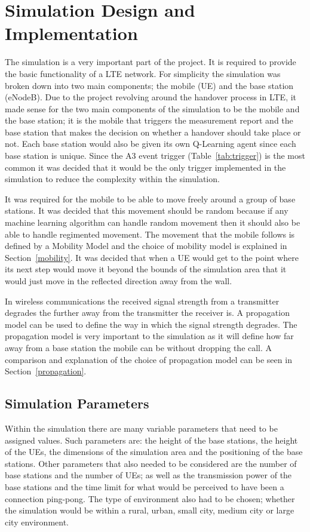 \chapter{Simulation Design and Implementation}
The simulation is a very important part of the project. It is required to provide the basic functionality of a LTE network. For simplicity the simulation was broken down into two main components; the mobile (UE) and the base station (eNodeB). Due to the project revolving around the handover process in LTE, it made sense for the two main components of the simulation to be the mobile and the base station; it is the mobile that triggers the measurement report and the base station that makes the decision on whether a handover should take place or not. Each base station would also be given its own Q-Learning agent since each base station is unique. Since the A3 event trigger (Table~\ref{tab:trigger}) is the most common it was decided that it would be the only trigger implemented in the simulation to reduce the complexity within the simulation.

It was required for the mobile to be able to move freely around a group of base stations. It was decided that this movement should be random because if any machine learning algorithm can handle random movement then it should also be able to handle regimented movement. The movement that the mobile follows is defined by a Mobility Model and the choice of mobility model is explained in Section~\ref{mobility}. It was decided that when a UE would get to the point where its next step would move it beyond the bounds of the simulation area that it would just move in the reflected direction away from the wall.

In wireless communications the received signal strength from a transmitter degrades the further away from the transmitter the receiver is. A propagation model can be used to define the way in which the signal strength degrades. The propagation model is very important to the simulation as it will define how far away from a base station the mobile can be without dropping the call. A comparison and explanation of the choice of propagation model can be seen in Section~\ref{propagation}.
\section{Simulation Parameters}
Within the simulation there are many variable parameters that need to be assigned values. Such parameters are: the height of the base stations, the height of the UEs, the dimensions of the simulation area and the positioning of the base stations. Other parameters that also needed to be considered are the number of base stations and the number of UEs; as well as the transmission power of the base stations and the time limit for what would be perceived to have been a connection ping-pong. The type of environment also had to be chosen; whether the simulation would be within a rural, urban, small city, medium city or large city environment.

